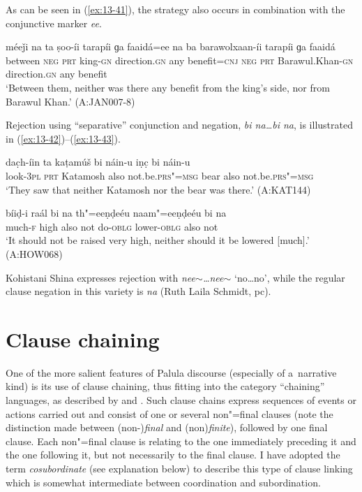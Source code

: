 As can be seen in (\ref{ex:13-41}), the strategy also occurs in combination with the conjunctive marker \textit{ee}.

\begin{exe}
\ex
\label{ex:13-41}
\gll méeǰi na ta ṣoo-íi tarapíi ɡa faaidá=ee na ba barawolxaan-íi tarapíi ɡa faaidá \\
between \textsc{neg} \textsc{prt } king-\textsc{gn} direction.\textsc{gn} any benefit=\textsc{cnj} \textsc{neg} \textsc{prt} Barawul.Khan-\textsc{gn} direction.\textsc{gn} any benefit  \\
\glt `Between them, neither was there any benefit from the king's side, nor from Barawul Khan.' (A:JAN007-8) 
\end{exe}

Rejection using ``separative'' conjunction and negation, \textit{bi na{\ldots}bi na}, is illustrated in (\ref{ex:13-42})--(\ref{ex:13-43}).

\begin{exe}
\ex
\label{ex:13-42}
\gll dac̣h-íin ta kaṭamúš bi náin-u iṇc̣ bi náin-u \\
look-\textsc{3pl} \textsc{prt} Katamosh also not.be.\textsc{prs"=msg} bear also not.be.\textsc{prs"=msg} \\
\glt `They saw that neither Katamosh nor the bear was there.' (A:KAT144)

\ex
\label{ex:13-43}
\gll bíiḍ-i raál bi na th"=eeṇḍeéu naam"=eeṇḍeéu bi na \\
much-\textsc{f} high also not do-\textsc{oblg} lower-\textsc{oblg} also not  \\
\glt `It should not be raised very high, neither should it be lowered [much].' (A:HOW068) 
\end{exe}

Kohistani Shina expresses rejection with \textit{nee$\sim${\ldots}nee$\sim$} `no{\ldots}no', while the regular clause negation in this variety is \textit{na} (Ruth Laila Schmidt, pc).


\section{Clause chaining}
\label{sec:13-3}

One of the more salient features of Palula discourse (especially of a~narrative kind) is its use of clause chaining, thus fitting into the category ``chaining'' languages, as described by \citet[242]{thompsonetal2007} and \citet[374--376]{longacre2007}. Such clause chains express sequences of events or actions carried out and consist of one or several non"=final clauses (note the distinction made between (non-)\textit{final} and (non)\textit{finite}), followed by one final clause. Each non"=final clause is relating to the one immediately preceding it and the one following it, but not necessarily to the final clause. I have adopted the term \textit{cosubordinate} (see explanation below) to describe this type of clause linking which is somewhat intermediate between coordination and subordination.


